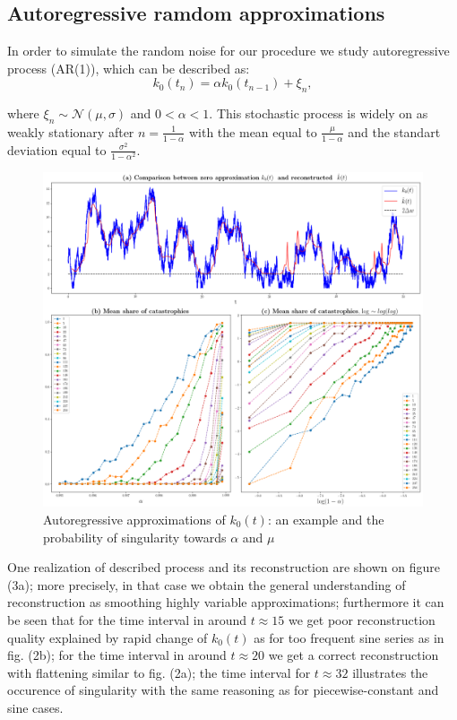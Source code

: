\documentclass{ws-ijbc}
\begin{document}
\subsection{Autoregressive ramdom approximations}

In order to simulate the random noise for our procedure we study autoregressive
process (AR(1)), which can be described as:
\[
k_{0}(t_{n})=\alpha k_{0}(t_{n-1})+\xi_{n},
\]

where $\xi_{n}\sim\mathcal{N}(\mu,\sigma)$ and $0<\alpha<1$. This
stochastic process is widely on as weakly stationary after $n=\frac{1}{1-\alpha}$
with the mean equal to $\frac{\mu}{1-\alpha}$ and the standart deviation
equal to $\frac{\sigma^{2}}{1-\alpha^{2}}$.

\begin{figure}[!h]
\centering{}\includegraphics[width=1\textwidth]{../../../python/pics/v2/ar1v2}\caption{Autoregressive approximations of $k_{0}(t)$: an example and the probability
of singularity towards $\alpha$ and $\mu$ \label{fig:ar}}
\end{figure}

One realization of described process and its reconstruction are shown
on figure (3a); more precisely, in that case we obtain the general
understanding of reconstruction as smoothing highly variable approximations;
furthermore it can be seen that for the time interval in around $t\approx15$
we get poor reconstruction quality explained by rapid change of $k_{0}(t)$
as for too frequent sine series as in fig. (2b); for the time interval
in around $t\approx20$ we get a correct reconstruction with flattening
similar to fig. (2a); the time interval for $t\approx32$ illustrates
the occurence of singularity with the same reasoning as for piecewise-constant
and sine cases.
\end{document}
